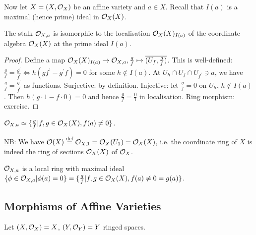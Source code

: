 \documentclass[a4paper,11pt]{article}
\begin{document}
			Now let $X=(X,\mathcal{O}_X)$ be an affine variety and $a\in X$. Recall that $I(a)$ is a maximal (hence prime) ideal in $\mathcal{O}_X(X)$.

			\begin{prop}
				The stalk $\mathcal{O}_{X,a}$ is isomorphic to the localisation $\mathcal{O}_X(X)_{I(a)}$ of the coordinate algebra $\mathcal{O}_X(X)$ at the prime ideal $I(a)$.
			\end{prop}
			\begin{proof}
				Define a map $\mathcal{O}_X(X)_{I(a)}\rightarrow\mathcal{O}_{X,a},\frac{g}{f}\mapsto\overline{(U_f,\frac{g}{f})}$. This is well-defined: $\frac{g}{f}=\frac{g^\prime}{f^\prime}\Longleftrightarrow h(gf^\prime-g^\prime f)=0$ for some $h\notin I(a)$. At $U_h\cap U_f\cap U_{f^\prime}\ni a$, we have $\frac{g}{f}=\frac{g^\prime}{f^\prime}$ as functions. Surjective: by definition. Injective: let $\frac{g}{f}=0$ on $U_h$, $h\notin I(a)$. Then $h(g\cdot1-f\cdot0)=0$ and hence $\frac{g}{f}=\frac{0}{1}$ in localisation. Ring morphism: exercise.
			\end{proof}

			\begin{cor}
				$\mathcal{O}_{X,a}\simeq\{\frac{g}{f}|f,g\in\mathcal{O}_X(X), f(a)\neq 0\}$.
			\end{cor}

			\noindent\underline{NB}: We have $\mathcal{O}(X)\overset{\text{def}}{=}\mathcal{O}_{X,1}=\mathcal{O}_X(U_1)=\mathcal{O}_X(X)$, i.e. the coordinate ring of $X$ is indeed the ring of sections $\mathcal{O}_X(X)$ of $\mathcal{O}_X$.

			\begin{cor}
				$\mathcal{O}_{X,a}$ is a local ring with maximal ideal $\{\phi\in\mathcal{O}_{X,a}|\phi(a)=0\}=\{\frac{g}{f}|f,g\in\mathcal{O}_X(X),f(a)\neq0=g(a)\}$.
			\end{cor}


		\subsection{Morphisms of Affine Varieties}

			Let $(X,\mathcal{O}_X)=X$, $(Y,\mathcal{O}_Y)=Y$ ringed spaces.
			\\
\end{document}
